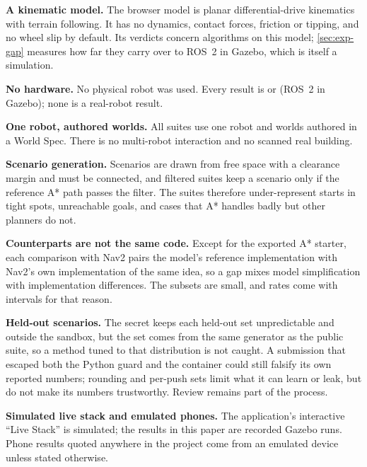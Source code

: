 \textbf{A kinematic model.} The browser model is planar differential-drive kinematics with terrain
following. It has no dynamics, contact forces, friction or tipping, and no wheel slip by default. Its
verdicts concern algorithms on this model; \cref{sec:exp-gap} measures how far they carry over to
ROS~2 in Gazebo, which is itself a simulation.

\textbf{No hardware.} No physical robot was used. Every result is  or 
(ROS~2 in Gazebo); none is a real-robot result.

\textbf{One robot, authored worlds.} All suites use one robot and worlds authored in a World Spec.
There is no multi-robot interaction and no scanned real building.

\textbf{Scenario generation.} Scenarios are drawn from free space with a clearance margin and must be
connected, and filtered suites keep a scenario only if the reference A* path passes the filter. The
suites therefore under-represent starts in tight spots, unreachable goals, and cases that A* handles
badly but other planners do not.

\textbf{Counterparts are not the same code.} Except for the exported A* starter, each comparison with
Nav2 pairs the model's reference implementation with Nav2's own implementation of the same idea, so a
gap mixes model simplification with implementation differences. The  subsets are small,
and rates come with intervals for that reason.

\textbf{Held-out scenarios.} The secret keeps each held-out set unpredictable and outside the sandbox,
but the set comes from the same generator as the public suite, so a method tuned to that distribution
is not caught. A submission that escaped both the Python guard and the container could still falsify
its own reported numbers; rounding and per-push sets limit what it can learn or leak, but do not make
its numbers trustworthy. Review remains part of the process.

\textbf{Simulated live stack and emulated phones.} The application's interactive ``Live Stack'' is
simulated; the  results in this paper are recorded Gazebo runs. Phone results quoted
anywhere in the project come from an emulated device unless stated otherwise.
